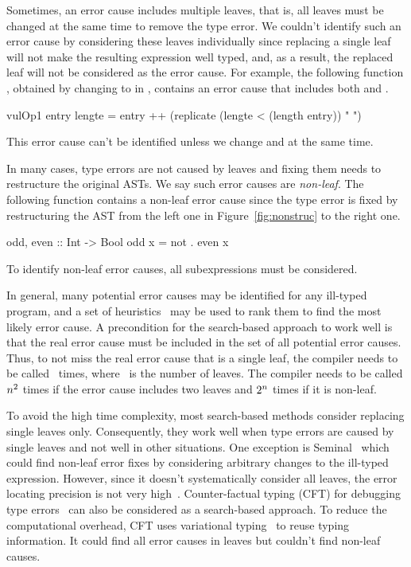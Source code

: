 \documentclass[12pt]{report}	%
\begin{document}
Sometimes, an error cause includes
multiple leaves, that is, all leaves must be changed at the
same time to remove the type error.
We couldn't identify such an error cause by
considering these leaves individually since replacing a single
leaf will not make the resulting expression well typed, and,
as a result, the replaced leaf will not be considered as
the error cause.
%
For example, the following function , obtained by changing
\prog{(-)} to \prog{(<)} in , contains an
error cause that includes both \prog{(<)} and .
%
%
\begin{program}
vulOp1 entry lengte = entry ++ (replicate (lengte < (length entry)) " ")
\end{program}
%
This error
cause can't be identified unless we change
\prog{(<)} and  at the same time.
%

In many cases, type errors are not caused by leaves and
fixing them needs to restructure the original ASTs.
We say such error causes are \emph{non-leaf}.
%
The following function  contains a non-leaf error cause
since the type error is fixed by restructuring the AST from the left one in
Figure~\ref{fig:nonstruc} to the right one.
%
\begin{program}
odd, even :: Int -> Bool
odd x = not . even x
\end{program}
%
To identify non-leaf error causes, all subexpressions must be
considered.

In general, many potential error causes may be identified for
any ill-typed program, and a set of
heuristics~\cite{Hage07:HTE,Lerner07:STM} may be used to
rank them to find the most likely error cause.
A precondition for the search-based approach to
work well is that the real error cause must be
included in the set of all potential error causes.
Thus, to not miss the real error cause that is a single leaf,
the compiler needs to be called \nlevs\ times, where \nlevs\
is the number of leaves. The compiler needs to be called
$n^2$ times if the error cause includes two leaves and
$2^{n}$ times if it is non-leaf.

To avoid the high time complexity,
most search-based methods consider replacing single leaves
only. Consequently, they work well when type errors
are caused by single leaves and not well in other situations.
One exception is Seminal~\cite{Lerner06:SSM,Lerner07:STM} which
could find non-leaf error fixes by considering arbitrary
changes to the ill-typed expression. However, since it doesn't
systematically consider all leaves, the error locating
precision is not very high~\cite{CE14popl,Zhang14:tgd}.
%
Counter-factual
typing (CFT) for debugging type errors~\cite{CE14popl,CE14flops}
can also be considered as a search-based approach. To reduce the
computational overhead, CFT uses
variational typing~\cite{CEW12icfp,CEW14toplas} to reuse
typing information. It could find all error causes in leaves
but couldn't find non-leaf causes.
\end{document}
